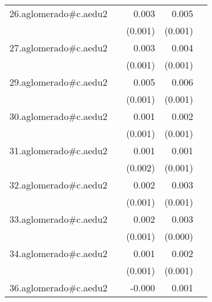 {\begin{longtable}{l*{4}{D{.}{.}{-1}}}
\addlinespace
26.aglomerado#c.aedu2&                     &       0.003\sym{*}  &       0.005\sym{***}&                     \\
            &                     &     (0.001)         &     (0.001)         &                     \\
\addlinespace
27.aglomerado#c.aedu2&                     &       0.003\sym{*}  &       0.004\sym{***}&                     \\
            &                     &     (0.001)         &     (0.001)         &                     \\
\addlinespace
29.aglomerado#c.aedu2&                     &       0.005\sym{***}&       0.006\sym{***}&                     \\
            &                     &     (0.001)         &     (0.001)         &                     \\
\addlinespace
30.aglomerado#c.aedu2&                     &       0.001         &       0.002\sym{*}  &                     \\
            &                     &     (0.001)         &     (0.001)         &                     \\
\addlinespace
31.aglomerado#c.aedu2&                     &       0.001         &       0.001         &                     \\
            &                     &     (0.002)         &     (0.001)         &                     \\
\addlinespace
32.aglomerado#c.aedu2&                     &       0.002         &       0.003\sym{***}&                     \\
            &                     &     (0.001)         &     (0.001)         &                     \\
\addlinespace
33.aglomerado#c.aedu2&                     &       0.002         &       0.003\sym{***}&                     \\
            &                     &     (0.001)         &     (0.000)         &                     \\
\addlinespace
34.aglomerado#c.aedu2&                     &       0.001         &       0.002\sym{*}  &                     \\
            &                     &     (0.001)         &     (0.001)         &                     \\
\addlinespace
36.aglomerado#c.aedu2&                     &      -0.000         &       0.001         &                     \\

\end{longtable}}
